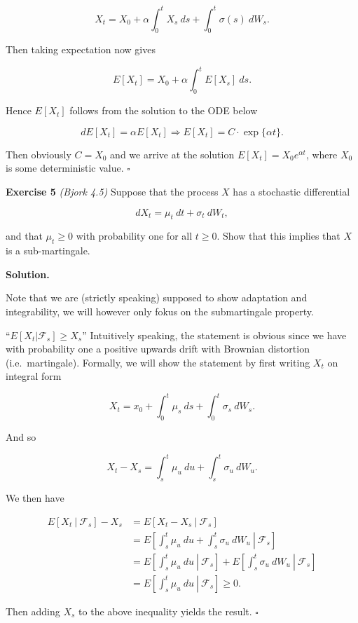 \documentclass[
]{article}
\begin{document}
\[
X_t=X_0+\alpha\int_0^tX_s\ ds+\int_0^t\sigma(s)\ dW_s.
\]

Then taking expectation now gives

\[
E[X_t]=X_0+\alpha\int_0^tE[X_s]\ ds.
\]

Hence \(E[X_t]\) follows from the solution to the ODE below

\[
dE[X_t]=\alpha E[X_t]\Rightarrow E[X_t]=C\cdot\exp\{\alpha t\}.
\]

Then obviously \(C=X_0\) and we arrive at the solution
\(E[X_t]=X_0e^{\alpha t}\), where \(X_0\) is some deterministic value.
\(\square\)

\textbf{Exercise 5} \emph{(Bjork 4.5)} Suppose that the process \(X\)
has a stochastic differential

\[
dX_t=\mu_t\ dt+\sigma_t\ dW_t,
\]

and that \(\mu_t\ge 0\) with probability one for all \(t\ge 0\). Show
that this implies that \(X\) is a sub-martingale.

\textbf{Solution.}

Note that we are (strictly speaking) supposed to show adaptation and
integrability, we will however only fokus on the submartingale property.

``\(E[X_t\vert \mathcal{F}_s]\ge X_s\)'' Intuitively speaking, the
statement is obvious since we have with probability one a positive
upwards drift with Brownian distortion (i.e.~martingale). Formally, we
will show the statement by first writing \(X_t\) on integral form

\[
X_t=x_0+\int_0^t\mu_s\ ds+\int_0^t\sigma_s\ dW_s.
\]

And so

\[
X_t-X_s=\int_s^t\mu_u\ du+\int_s^t\sigma_u\ dW_u.
\]

We then have

\begin{align*}
E[X_t\ \vert\ \mathcal{F}_s]-X_s&=E[X_t-X_s\ \vert\ \mathcal{F}_s]\\
&=E\left[\left.\int_s^t\mu_u\ du+\int_s^t\sigma_u\ dW_u\ \right\vert\ \mathcal{F}_s\right]\\
&=E\left[\left.\int_s^t\mu_u\ du\ \right\vert\ \mathcal{F}_s\right]+E\left[\left.\int_s^t\sigma_u\ dW_u\ \right\vert\ \mathcal{F}_s\right]\\
&=E\left[\left.\int_s^t\mu_u\ du\ \right\vert\ \mathcal{F}_s\right]\ge 0.
\end{align*}

Then adding \(X_s\) to the above inequality yields the result.
\(\square\)
\end{document}
